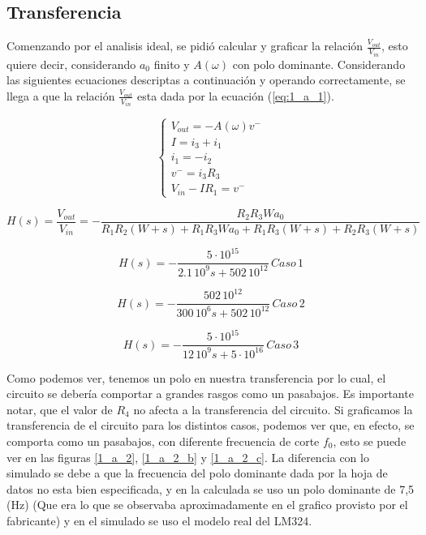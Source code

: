 \subsection{Transferencia\label{subsec:1_a_1}}

Comenzando por el analisis ideal, se pidió calcular y graficar la
relación $\frac{V_{out}}{V_{in}}$, esto quiere decir, considerando
$a_{0}$ finito y $A(\omega)$ con polo dominante. Considerando las
siguientes ecuaciones descriptas a continuación y operando correctamente,
se llega a que la relación $\frac{V_{out}}{V_{in}}$ esta dada por
la ecuación (\ref{eq:1_a_1}).

\[
\left\{ \begin{array}{c}
V_{out}=-A(\omega)v^{-}\\
I=i_{3}+i_{1}\\
i_{1}=-i_{2}\\
v^{-}=i_{3}R_{3}\\
V_{in}-IR_{1}=v^{-}
\end{array}\right.
\]

\begin{equation}
H(s)=\frac{V_{out}}{V_{in}}=-\frac{R_{2}R_{3}Wa_{0}}{R_{1}R_{2}\left(W+s\right)+R_{1}R_{3}Wa_{0}+R_{1}R_{3}\left(W+s\right)+R_{2}R_{3}\left(W+s\right)}\label{eq:1_a_1}
\end{equation}

\[
H(s)=-\frac{5\cdot10^{15}}{2.1\,10^{9}s+502\,10^{12}}\,Caso\,1
\]

\[
H(s)=-\frac{502\,10^{12}}{300\,10^{6}s+502\,10^{12}}\,Caso\,2
\]

\[
H(s)=-\frac{5\cdot10^{15}}{12\,10^{9}s+5\cdot10^{16}}\,Caso\,3
\]

Como podemos ver, tenemos un polo en nuestra transferencia por lo
cual, el circuito se debería comportar a grandes rasgos como un pasabajos.
Es importante notar, que el valor de $R_{4}$ no afecta a la transferencia
del circuito. Si graficamos la transferencia de el circuito para los
distintos casos, podemos ver que, en efecto, se comporta como un pasabajos,
con diferente frecuencia de corte $f_{0}$, esto se puede ver en las
figuras \ref{1_a_2}, \ref{1_a_2_b} y \ref{1_a_2_c}. La diferencia
con lo simulado se debe a que la frecuencia del polo dominante dada
por la hoja de datos no esta bien especificada, y en la calculada
se uso un polo dominante de 7,5 (Hz) (Que era lo que se observaba
aproximadamente en el grafico provisto por el fabricante) y en el
simulado se uso el modelo real del LM324.

